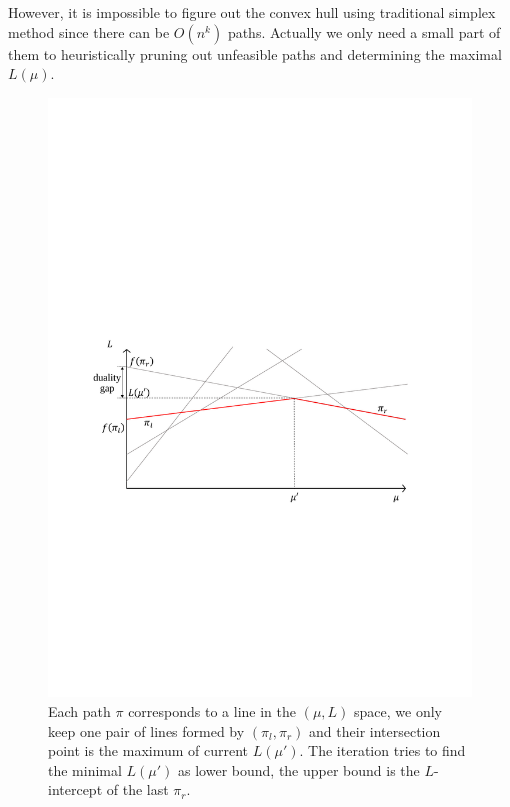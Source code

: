 \documentclass{sig-alternate-05-2015}
\begin{document}
However, it is impossible to figure out the convex hull using traditional simplex method since there can be $ O(n^k) $ paths.
Actually we only need a small part of them to heuristically pruning out unfeasible paths and determining the maximal $ L(\mu) $.
\begin{figure}
	\centering
	\includegraphics[width=1.0\linewidth]{intersection}
	\caption{Each path $ \pi $ corresponds to a line in the $ (\mu, L) $ space, we only keep one pair of lines formed by $ (\pi_l, \pi_r) $ and their intersection point is the maximum of current $ L(\mu') $. The iteration tries to find the minimal $ L(\mu') $ as lower bound, the upper bound is the $ L $-intercept of the last $ \pi_r $.}
	\label{fig: intersection}
\end{figure}
\end{document}
